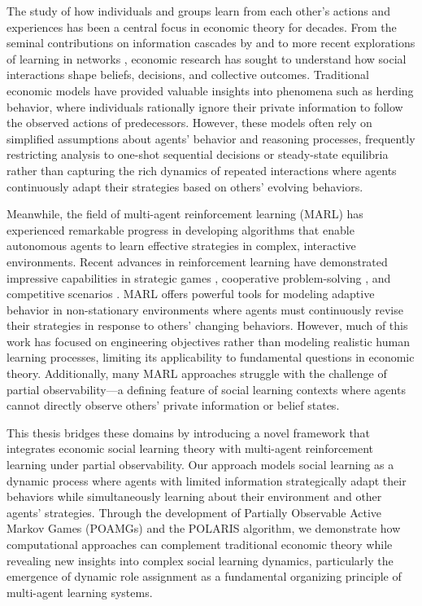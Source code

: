 The study of how individuals and groups learn from each other's actions and experiences has been a central focus in economic theory for decades. From the seminal contributions on information cascades by \citet{banerjee1992simple} and \citet{bikhchandani1992theory} to more recent explorations of learning in networks \citep{acemoglu2011bayesian, golub2010naive}, economic research has sought to understand how social interactions shape beliefs, decisions, and collective outcomes. Traditional economic models have provided valuable insights into phenomena such as herding behavior, where individuals rationally ignore their private information to follow the observed actions of predecessors. However, these models often rely on simplified assumptions about agents' behavior and reasoning processes, frequently restricting analysis to one-shot sequential decisions or steady-state equilibria rather than capturing the rich dynamics of repeated interactions where agents continuously adapt their strategies based on others' evolving behaviors.

Meanwhile, the field of multi-agent reinforcement learning (MARL) has experienced remarkable progress in developing algorithms that enable autonomous agents to learn effective strategies in complex, interactive environments. Recent advances in reinforcement learning have demonstrated impressive capabilities in strategic games \citep{silver2016mastering}, cooperative problem-solving \citep{baker2020emergentreciprocityteamformation}, and competitive scenarios \citep{openai2019dota2largescale}.  MARL offers powerful tools for modeling adaptive behavior in non-stationary environments where agents must continuously revise their strategies in response to others' changing behaviors. However, much of this work has focused on engineering objectives rather than modeling realistic human learning processes, limiting its applicability to fundamental questions in economic theory. Additionally, many MARL approaches struggle with the challenge of partial observability—a defining feature of social learning contexts where agents cannot directly observe others' private information or belief states.

This thesis bridges these domains by introducing a novel framework that integrates economic social learning theory with multi-agent reinforcement learning under partial observability. Our approach models social learning as a dynamic process where agents with limited information strategically adapt their behaviors while simultaneously learning about their environment and other agents' strategies. Through the development of Partially Observable Active Markov Games (POAMGs) and the POLARIS algorithm, we demonstrate how computational approaches can complement traditional economic theory while revealing new insights into complex social learning dynamics, particularly the emergence of dynamic role assignment as a fundamental organizing principle of multi-agent learning systems.


